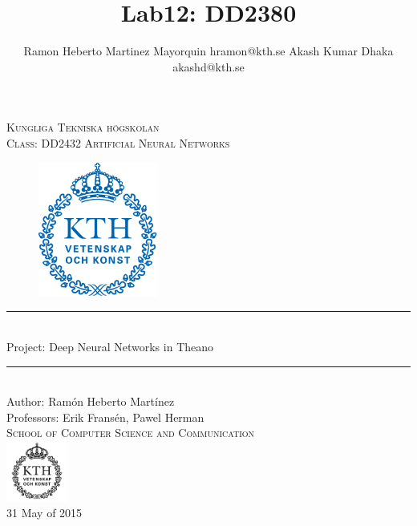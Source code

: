 \documentclass[11pt,a4paper]{article}
\title{Lab12: DD2380 }
\author{
Ramon Heberto Martinez Mayorquin  hramon@kth.se 
Akash Kumar Dhaka  akashd@kth.se 
}
\newcommand{\HRule}{\rule{\linewidth}{0.5mm}}
\begin{document}
\begin{titlepage}
\begin{center}

\textsc{\LARGE Kungliga Tekniska högskolan}\\[1.0cm]

\textsc{\Large Class: DD2432 Artificial Neural Networks}\\[2.0cm]



\begin{figure}[H]
	\centering
 \includegraphics[width=0.35\textwidth]{Kth_logo.png}
\end{figure}


\HRule \\[0.4cm]
{ \huge  Project: Deep Neural Networks in Theano
}\\[0.4cm]
\HRule \\[1.5cm]


Author: Ram\'on Heberto Mart\'inez \\ 
\large Professors: Erik Frans\'en, Pawel Herman  \\ [2.5cm]

\textsc{\Large School of Computer Science and Communication }\\ [1.0cm] 
\includegraphics[width=0.15\textwidth]{KTH_black.png}\\[1.5cm] %
{\large 31 May of 2015}

\end{center}
\end{titlepage}
\end{document}
